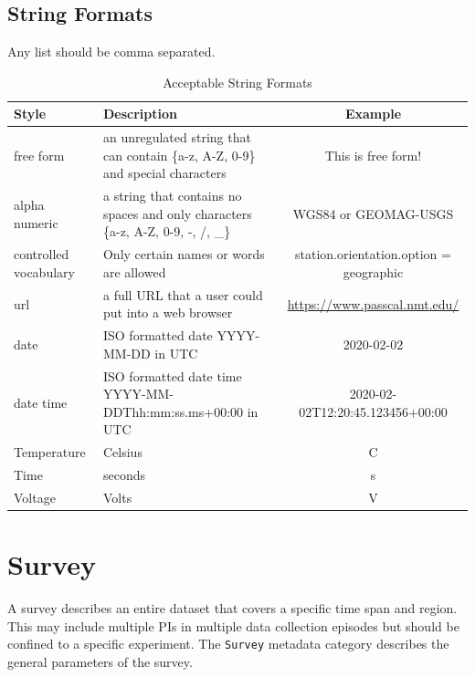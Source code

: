 \documentclass{article}
\begin{document}
\subsection{String Formats}

Any list should be comma separated.

\begin{table}[htb!]
	\centering
	\caption[Acceptable String Formats]{Acceptable String Formats}
	\begin{tabular}{|l|p{3.5in}|c|}
		\hline
		\textbf{Style} & \textbf{Description}  & \textbf{Example} \\ \hline
		free form & an unregulated string that can contain \{a-z, A-Z, 0-9\} and special characters & This is free form! \\ \hline
		
		alpha numeric & a string that contains no spaces and only characters \{a-z, A-Z, 0-9, -, /, \_\} & WGS84 or GEOMAG-USGS \\ \hline
		controlled vocabulary & Only certain names or words are allowed &  station.orientation.option = geographic \\ \hline
		url & a full URL that a user could put into a web browser  &  \url{https://www.passcal.nmt.edu/} \\ \hline
		date & ISO formatted date YYYY-MM-DD in UTC & 2020-02-02 \\ \hline
		date time & ISO formatted date time YYYY-MM-DDThh:mm:ss.ms+00:00 in UTC & 2020-02-02T12:20:45.123456+00:00 \\ \hline
		Temperature & Celsius & C \\ \hline
		Time &  seconds & s \\ \hline
		Voltage & Volts & V \\ \hline
		
		
	\end{tabular}
	\label{tab:values}
\end{table}

\clearpage
\newpage
\section{Survey}

A survey describes an entire dataset that covers a specific time span and region. This may include multiple PIs in multiple data collection episodes but should be confined to a specific experiment. The \verb|Survey| metadata category describes the general parameters of the survey.
\end{document}
